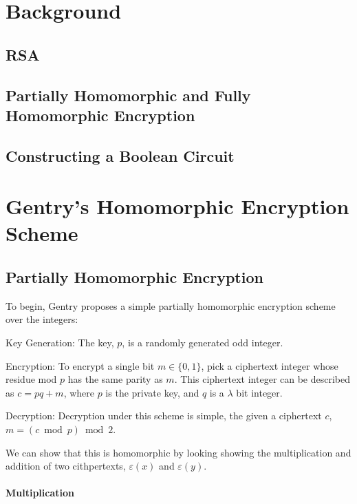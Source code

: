\documentclass[a4paper,10pt]{article}
\begin{document}
\section{Background}

\subsection{RSA}


\subsection{Partially Homomorphic and Fully Homomorphic Encryption}

\subsection{Constructing a Boolean Circuit}


\section{Gentry's Homomorphic Encryption Scheme}

\subsection{Partially Homomorphic Encryption}
To begin, Gentry proposes a simple partially homomorphic encryption
scheme over the integers:

Key Generation: The key, $p$, is a randomly generated odd integer.

Encryption: To encrypt a single bit $ m \in \{0,1\} $, pick a
ciphertext integer whose residue mod $ p $ has the same parity as
$m$. This ciphertext integer can be described as $ c = pq + m $, where
$ p $ is the private key, and $q$ is a $\lambda$ bit integer.

Decryption: Decryption under this scheme is simple, the given a
ciphertext $c$, $ m = ( c \bmod p) \bmod 2 $.

We can show that this is homomorphic by looking showing the
multiplication and addition of two cithpertexts, $ \varepsilon(x) $
and $ \varepsilon(y) $.

\paragraph{Multiplication}
\begin{eqnarray*}
\end{eqnarray*}
\end{document}

